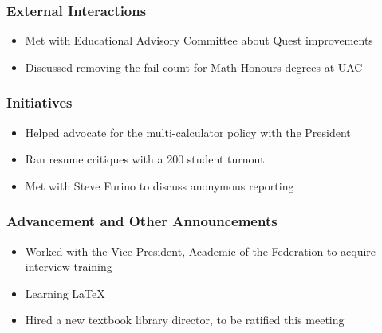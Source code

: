 \subsubsection*{External Interactions}
\begin{itemize}
\item Met with Educational Advisory Committee about Quest improvements
\item Discussed removing the fail count for Math Honours degrees at UAC
\end{itemize}

\subsubsection*{Initiatives}
\begin{itemize}
\item Helped advocate for the multi-calculator policy with the President
\item Ran resume critiques with a 200 student turnout 
\item Met with Steve Furino to discuss anonymous reporting
\end{itemize}

\subsubsection*{Advancement and Other Announcements}
\begin{itemize}
\item Worked with the Vice President, Academic of the Federation to acquire interview training
\item Learning \LaTeX\
\item Hired a new textbook library director, to be ratified this meeting
\end{itemize}